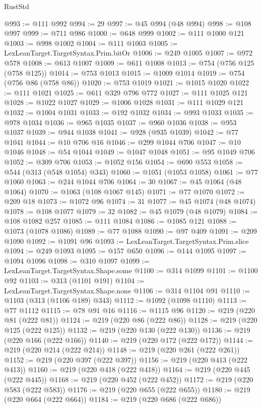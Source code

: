 \begin{lexlean}{RustStd}
\begin{coremodule}
@993 := @111 @992
@994 := 29
@997 := @45 @994 (@48 @994)
@998 := @108 @997
@999 := @711 @986
@1000 := @648 @999
@1002 := @111 @1000 @121
@1003 := @998 @1002
@1004 := @111 @1003
@1005 := LexLeanTarget.TargetSyntax.Prim.bitOr
@1006 := @249 @1005
@1007 := @972 @578
@1008 := @613 @1007
@1009 := @611 @1008
@1013 := @754 (@756 @125 (@758 @125))
@1014 := @753 @1013
@1015 := @1009 @1014
@1019 := @754 (@756 @86 (@758 @86))
@1020 := @753 @1019
@1021 := @1015 @1020
@1022 := @111 @1021
@1025 := @611 @329 @796 @772
@1027 := @111 @1025 @121
@1028 := @1022 @1027
@1029 := @1006 @1028
@1031 := @111 @1029 @121
@1032 := @1004 @1031
@1033 := @192 @1032
@1034 := @993 @1033
@1035 := @978 @1034
@1036 := @965 @1035
@1037 := @960 @1036
@1038 := @953 @1037
@1039 := @944 @1038
@1041 := @928 (@935 @1039)
@1042 := @77 @1041
@1044 := @10 @706 @16
@1046 := @299 @1044 @706
@1047 := @10 @1046
@1048 := @54 @1044
@1049 := @1047 @1048
@1051 := @95 @1049 @706
@1052 := @309 @706
@1053 := @1052 @156
@1054 := @690 @553
@1058 := @544 (@313 (@548 @1054) @343)
@1060 := @1051 (@1053 @1058)
@1061 := @77 @1060
@1063 := @244 @1044 @706
@1064 := 30
@1067 := @45 @1064 (@48 @1064)
@1070 := @1063 (@108 @1067 @145)
@1071 := @77 @1070
@1072 := @209 @18
@1073 := @1072 @96
@1074 := 31
@1077 := @45 @1074 (@48 @1074)
@1078 := @108 @1077
@1079 := 32
@1082 := @45 @1079 (@48 @1079)
@1084 := @108 @1082 @257
@1085 := @111 @1084
@1086 := @1085 @121
@1088 := @1073 (@1078 @1086)
@1089 := @77 @1088
@1090 := @97 @409
@1091 := @209 @1090
@1092 := @1091 @96
@1093 := LexLeanTarget.TargetSyntax.Prim.slice
@1094 := @249 @1093
@1095 := @157 @650
@1096 := @144 @1095
@1097 := @1094 @1096
@1098 := @310 @1097
@1099 := LexLeanTarget.TargetSyntax.Shape.some
@1100 := @314 @1099
@1101 := @1100 @92
@1103 := @313 (@1101 @191)
@1104 := LexLeanTarget.TargetSyntax.Shape.none
@1106 := @314 @1104 @91
@1110 := @1103 (@313 (@1106 @189) @343)
@1112 := @1092 (@1098 @1110)
@1113 := @77 @1112
@1115 := @78 @91 @16
@1116 := @1115 @96
@1120 := @219 (@220 @81 (@222 @81))
@1124 := @219 (@220 @86 (@222 @86))
@1128 := @219 (@220 @125 (@222 @125))
@1132 := @219 (@220 @130 (@222 @130))
@1136 := @219 (@220 @166 (@222 @166))
@1140 := @219 (@220 @172 (@222 @172))
@1144 := @219 (@220 @214 (@222 @214))
@1148 := @219 (@220 @261 (@222 @261))
@1152 := @219 (@220 @397 (@222 @397))
@1156 := @219 (@220 @413 (@222 @413))
@1160 := @219 (@220 @418 (@222 @418))
@1164 := @219 (@220 @445 (@222 @445))
@1168 := @219 (@220 @452 (@222 @452))
@1172 := @219 (@220 @583 (@222 @583))
@1176 := @219 (@220 @655 (@222 @655))
@1180 := @219 (@220 @664 (@222 @664))
@1184 := @219 (@220 @686 (@222 @686))

\end{coremodule}
\end{lexlean}
